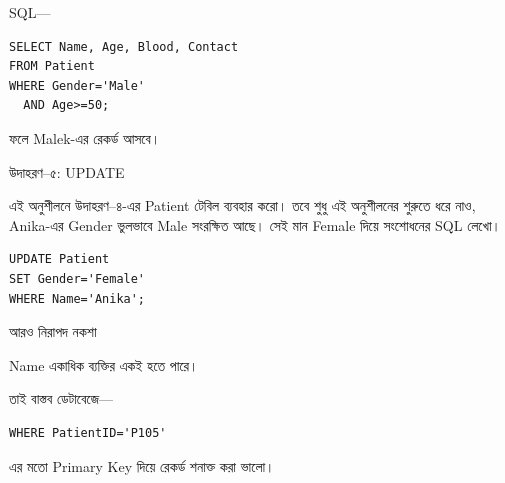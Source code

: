 SQL—

\par\noindent\begin{minipage}{\linewidth}
\begin{verbatim}
SELECT Name, Age, Blood, Contact
FROM Patient
WHERE Gender='Male'
  AND Age>=50;
\end{verbatim}
\end{minipage}\par


ফলে Malek-এর রেকর্ড আসবে।




\begin{boardbox}{উদাহরণ--৫: UPDATE}

এই অনুশীলনে উদাহরণ--৪-এর Patient টেবিল ব্যবহার করো। তবে শুধু এই অনুশীলনের শুরুতে ধরে নাও, Anika-এর Gender ভুলভাবে Male সংরক্ষিত আছে। সেই মান Female দিয়ে সংশোধনের SQL লেখো।

\end{boardbox}


\par\noindent\begin{minipage}{\linewidth}
\begin{verbatim}
UPDATE Patient
SET Gender='Female'
WHERE Name='Anika';
\end{verbatim}
\end{minipage}\par


\begin{keypointbox}{আরও নিরাপদ নকশা}

Name একাধিক ব্যক্তির একই হতে পারে।

তাই বাস্তব ডেটাবেজে—

\par\noindent\begin{minipage}{\linewidth}
\begin{verbatim}
WHERE PatientID='P105'
\end{verbatim}
\end{minipage}\par

এর মতো Primary Key দিয়ে রেকর্ড শনাক্ত করা ভালো।

\end{keypointbox}




